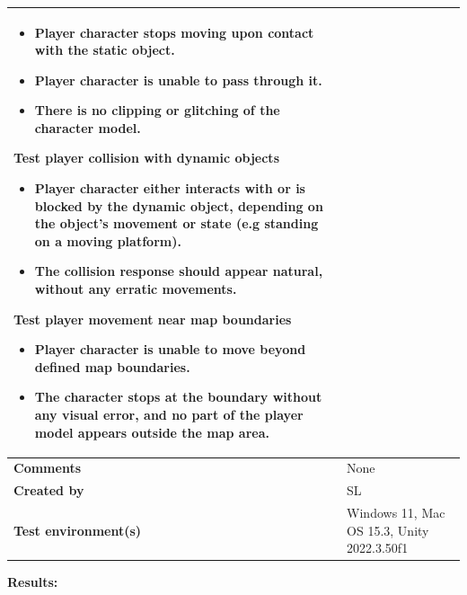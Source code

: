 \documentclass[11pt, a4paper]{article}
\begin{document}
\begin{center}
\begin{tabularx}{\linewidth}{|>{\raggedright\arraybackslash}m{4cm}|X|}
    \begin{itemize}
        \item Player character stops moving upon contact with the static object.
        \item Player character is unable to pass through it.
        \item There is no clipping or glitching of the character model.
    \end{itemize}
    \textbf{Test player collision with dynamic objects}
    \begin{itemize}
        \item Player character either interacts with or is blocked by the dynamic object, depending on the object’s movement or state (e.g standing on a moving platform).
        \item The collision response should appear natural, without any erratic movements.
    \end{itemize}
    \textbf{Test player movement near map boundaries}
    \begin{itemize}
        \item Player character is unable to move beyond defined map boundaries.
        \item The character stops at the boundary without any visual error, and no part of the player model appears outside the map area.
    \end{itemize}
    \\
    \hline
    \textbf{Comments} & None \\
    \hline
    \textbf{Created by} & SL \\
    \hline
    \textbf{Test environment(s)} & Windows 11, Mac OS 15.3, Unity 2022.3.50f1 \\
    \hline
\end{tabularx}
\end{center}

\newpage

\noindent \textbf{Results:}
\end{document}
